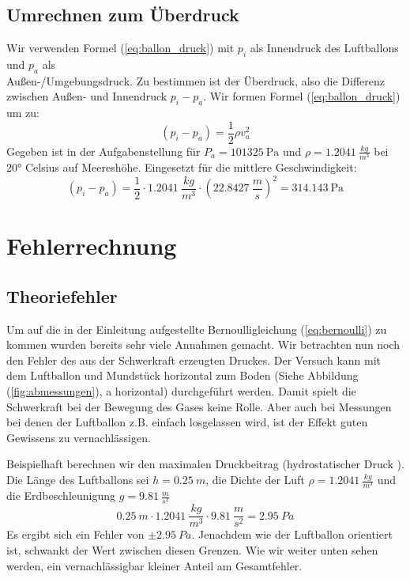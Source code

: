 \documentclass{article}
\begin{document}
    \subsection{Umrechnen zum Überdruck}
    Wir verwenden Formel (\ref{eq:ballon_druck}) mit \(p_i\) als Innendruck des Luftballons und \(p_a\) als \\
    Außen-/Umgebungsdruck.
    Zu bestimmen ist der Überdruck, also die Differenz zwischen Außen- und Innendruck \(p_i - p_a\).
    Wir formen Formel (\ref{eq:ballon_druck}) um zu:
    \begin{equation} \label{eq:ballon_uberdruck}
        (p_i - p_a) = \frac{1}{2} \rho v_a^2
    \end{equation}
    Gegeben ist in der Aufgabenstellung \cite{Aufgabenstellung} für \( P_a = \SI{101 325}{\pascal} \) und \(\rho = \SI{1.2041}{\frac{kg}{m^3}} \) bei 20° Celsius auf Meereshöhe. 
    Eingesetzt für die mittlere Geschwindigkeit:
    \begin{equation} \label{eq:druck_wert}
        (p_i - p_a) = \frac{1}{2} \cdot \SI{1.2041}{\frac{kg}{m^3}} \cdot { ( \SI{22.8427}{\frac{m}{s}} )}^2 = \SI{314.143}{\pascal}
    \end{equation}
    
    \section{Fehlerrechnung}\label{fehlerrechnung}
        \subsection{Theoriefehler}
            Um auf die in der Einleitung aufgestellte Bernoulligleichung (\ref{eq:bernoulli}) zu kommen wurden bereits sehr viele Annahmen gemacht.
            Wir betrachten nun noch den Fehler des aus der Schwerkraft erzeugten Druckes.
            Der Versuch kann mit dem Luftballon und Mundstück horizontal zum Boden (Siehe Abbildung (\ref{fig:abmessungen}), a horizontal) durchgeführt werden.
            Damit spielt die Schwerkraft bei der Bewegung des Gases keine Rolle. Aber auch bei Messungen bei denen der Luftballon z.B. einfach losgelassen wird,
            ist der Effekt guten Gewissens zu vernachlässigen.

            Beispielhaft berechnen wir den maximalen Druckbeitrag (hydrostatischer Druck \cite{Luftdruck}).
            Die Länge des Luftballons sei \(h = \SI{0.25}{m}\), die Dichte der Luft \(\rho = \SI{1.2041}{\frac{kg}{m^3}} \) \cite{Aufgabenstellung}
            und die Erdbeschleunigung \(g = \SI{9.81}{\frac{m}{s^2}} \)
            \begin{equation}
                \SI{0.25}{m} \cdot \SI{1.2041}{\frac{kg}{m^3}} \cdot \SI{9.81}{\frac{m}{s^2}} = \SI{2.95}{Pa} %
            \end{equation}
            Es ergibt sich ein Fehler von \(\pm \SI{2.95}{Pa}\). Jenachdem wie der Luftballon orientiert ist, schwankt der Wert zwischen diesen Grenzen.
            Wie wir weiter unten sehen werden, ein vernachlässigbar kleiner Anteil am Gesamtfehler.
\end{document}
